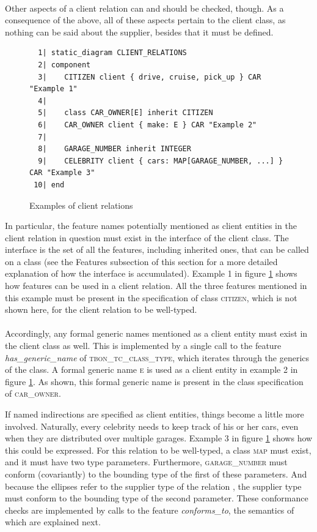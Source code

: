 \paragraph{}
Other aspects of a client relation can and should be checked, though. As a consequence of the above, all of these aspects pertain to the client class, as nothing can be said about the supplier, besides that it must be defined.
\begin{figure}[H]
{\footnotesize
\begin{verbatim}
  1| static_diagram CLIENT_RELATIONS
  2| component
  3|    CITIZEN client { drive, cruise, pick_up } CAR "Example 1"
  4|  
  5|    class CAR_OWNER[E] inherit CITIZEN
  6|    CAR_OWNER client { make: E } CAR "Example 2"
  7| 
  8|    GARAGE_NUMBER inherit INTEGER
  9|    CELEBRITY client { cars: MAP[GARAGE_NUMBER, ...] } CAR "Example 3"
 10| end
\end{verbatim}
}
\caption{Examples of client relations}
\label{fig:client_relations}
\end{figure}
In particular, the feature names potentially mentioned as client entities in the client relation in question must exist in the interface of the client class. The interface is the set of all the features, including inherited ones, that can be called on a class (see the Features subsection of this section for a more detailed explanation of how the interface is accumulated). Example 1 in figure \ref{fig:client_relations} shows how features can be used in a client relation. All the three features mentioned in this example must be present in the specification of class \textsc{citizen}, which is not shown here, for the client relation to be well-typed.
\paragraph{}
Accordingly, any formal generic names mentioned as a client entity must exist in the client class as well. This is implemented by a single call to the feature \textit{has\_generic\_name} of \textsc{tbon\_tc\_class\_type}, which iterates through the generics of the class. A formal generic name \textsc{e} is used as a client entity in example 2 in figure \ref{fig:client_relations}. As shown, this formal generic name is present in the class specification of \textsc{car\_owner}.

If named indirections are specified as client entities, things become a little more involved. Naturally, every celebrity needs to keep track of his or her cars, even when they are distributed over multiple garages. Example 3 in figure \ref{fig:client_relations} shows how this could be expressed. For this relation to be well-typed, a class \textsc{map} must exist, and it must have two type parameters. Furthermore, \textsc{garage\_number} must conform (covariantly) to the bounding type of the first of these parameters. And because the ellipses refer to the supplier type of the relation \cite[p.~371]{walden1995}, the supplier type must conform to the bounding type of the second parameter. These conformance checks are implemented by calls to the feature \textit{conforms\_to}, the semantics of which are explained next.
